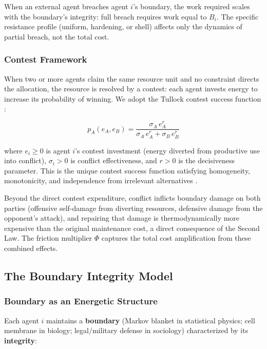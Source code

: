 \documentclass[11pt]{article}
\theoremstyle{plain}
\theoremstyle{definition}
\theoremstyle{remark}
\let\origsubsection\subsection
\renewcommand{\subsection}{\needspace{7\baselineskip}\origsubsection}
\let\origsubsubsection\subsubsection
\renewcommand{\subsubsection}{\needspace{4\baselineskip}\origsubsubsection}
\begin{document}
When an external agent breaches agent \(i\)'s boundary, the work
required scales with the boundary's integrity: full breach requires work
equal to \(B_i\). The specific resistance profile (uniform, hardening,
or shell) affects only the dynamics of partial breach, not the total
cost.

\subsubsection{Contest Framework}\label{contest-framework}

When two or more agents claim the same resource unit and no constraint
directs the allocation, the resource is resolved by a contest: each
agent invests energy to increase its probability of winning. We adopt
the Tullock contest success function \citep{Tullock1980, Skaperdas1996}:

\[p_A(e_A, e_B) = \frac{\sigma_A \, e_A^r}{\sigma_A \, e_A^r + \sigma_B \, e_B^r}\]

where \(e_i \geq 0\) is agent \(i\)'s contest investment (energy
diverted from productive use into conflict), \(\sigma_i > 0\) is
conflict effectiveness, and \(r > 0\) is the decisiveness parameter.
This is the unique contest success function satisfying homogeneity,
monotonicity, and independence from irrelevant alternatives
\citep{Skaperdas1996}.

Beyond the direct contest expenditure, conflict inflicts boundary damage
on both parties (offensive self-damage from diverting resources,
defensive damage from the opponent's attack), and repairing that damage
is thermodynamically more expensive than the original maintenance cost,
a direct consequence of the Second Law. The friction multiplier \(\Phi\)
captures the total cost amplification from these combined effects.

\subsection{The Boundary Integrity
Model}\label{the-boundary-integrity-model}

\subsubsection{Boundary as an Energetic
Structure}\label{boundary-as-an-energetic-structure}

Each agent \(i\) maintains a \textbf{boundary} (Markov blanket in
statistical physics; cell membrane in biology; legal/military defense in
sociology) characterized by its \textbf{integrity}:
\end{document}
